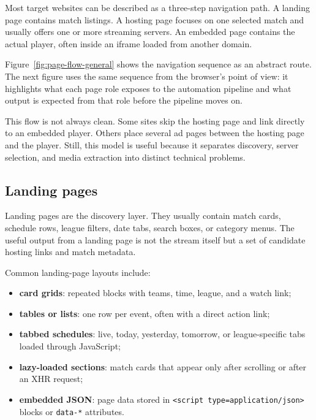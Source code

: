 Most target websites can be described as a three-step navigation path. A landing page
contains match listings. A hosting page focuses on one selected match and usually offers
one or more streaming servers. An embedded page contains the actual player, often inside
an iframe loaded from another domain.



Figure~\ref{fig:page-flow-general} shows the navigation sequence as an abstract route.
The next figure uses the same sequence from the browser's point of view: it highlights
what each page role exposes to the automation pipeline and what output is expected from
that role before the pipeline moves on.



This flow is not always clean. Some sites skip the hosting page and link directly to an
embedded player. Others place several ad pages between the hosting page and the player.
Still, this model is useful because it separates discovery, server selection, and media
extraction into distinct technical problems.

\subsection{Landing pages}

Landing pages are the discovery layer. They usually contain match cards, schedule rows,
league filters, date tabs, search boxes, or category menus. The useful output from a
landing page is not the stream itself but a set of candidate hosting links and match
metadata.

Common landing-page layouts include:

\begin{itemize}
  \item \textbf{card grids}: repeated blocks with teams, time, league, and a watch link;
  \item \textbf{tables or lists}: one row per event, often with a direct action link;
  \item \textbf{tabbed schedules}: live, today, yesterday, tomorrow, or league-specific
    tabs loaded through JavaScript;
  \item \textbf{lazy-loaded sections}: match cards that appear only after scrolling or
    after an XHR request;
  \item \textbf{embedded JSON}: page data stored in \texttt{<script type=application/json>}
    blocks or \texttt{data-*} attributes.
\end{itemize}

